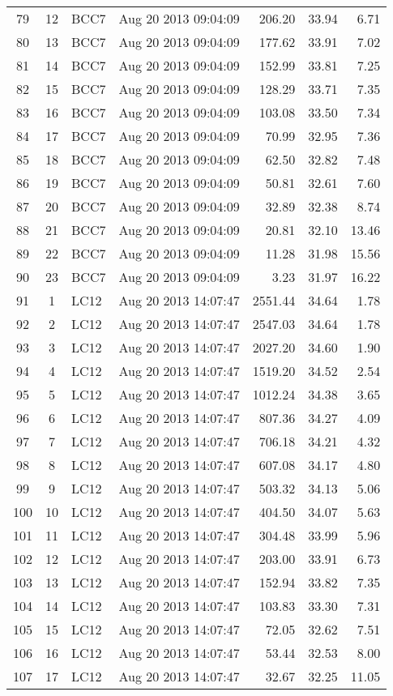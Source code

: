 \documentclass{article}
\begin{document}
\begin{longtable}{ccllrrr}
79&12&BCC7&Aug 20 2013 09:04:09&206.20&33.94&6.71\\
80&13&BCC7&Aug 20 2013 09:04:09&177.62&33.91&7.02\\
81&14&BCC7&Aug 20 2013 09:04:09&152.99&33.81&7.25\\
82&15&BCC7&Aug 20 2013 09:04:09&128.29&33.71&7.35\\
83&16&BCC7&Aug 20 2013 09:04:09&103.08&33.50&7.34\\
84&17&BCC7&Aug 20 2013 09:04:09&70.99&32.95&7.36\\
85&18&BCC7&Aug 20 2013 09:04:09&62.50&32.82&7.48\\
86&19&BCC7&Aug 20 2013 09:04:09&50.81&32.61&7.60\\
87&20&BCC7&Aug 20 2013 09:04:09&32.89&32.38&8.74\\
88&21&BCC7&Aug 20 2013 09:04:09&20.81&32.10&13.46\\
89&22&BCC7&Aug 20 2013 09:04:09&11.28&31.98&15.56\\
90&23&BCC7&Aug 20 2013 09:04:09&3.23&31.97&16.22\\
\hline 
91&1&LC12&Aug 20 2013 14:07:47&2551.44&34.64&1.78\\
92&2&LC12&Aug 20 2013 14:07:47&2547.03&34.64&1.78\\
93&3&LC12&Aug 20 2013 14:07:47&2027.20&34.60&1.90\\
94&4&LC12&Aug 20 2013 14:07:47&1519.20&34.52&2.54\\
95&5&LC12&Aug 20 2013 14:07:47&1012.24&34.38&3.65\\
96&6&LC12&Aug 20 2013 14:07:47&807.36&34.27&4.09\\
97&7&LC12&Aug 20 2013 14:07:47&706.18&34.21&4.32\\
98&8&LC12&Aug 20 2013 14:07:47&607.08&34.17&4.80\\
99&9&LC12&Aug 20 2013 14:07:47&503.32&34.13&5.06\\
100&10&LC12&Aug 20 2013 14:07:47&404.50&34.07&5.63\\
101&11&LC12&Aug 20 2013 14:07:47&304.48&33.99&5.96\\
102&12&LC12&Aug 20 2013 14:07:47&203.00&33.91&6.73\\
103&13&LC12&Aug 20 2013 14:07:47&152.94&33.82&7.35\\
104&14&LC12&Aug 20 2013 14:07:47&103.83&33.30&7.31\\
105&15&LC12&Aug 20 2013 14:07:47&72.05&32.62&7.51\\
106&16&LC12&Aug 20 2013 14:07:47&53.44&32.53&8.00\\
107&17&LC12&Aug 20 2013 14:07:47&32.67&32.25&11.05\\

\end{longtable}
\end{document}
